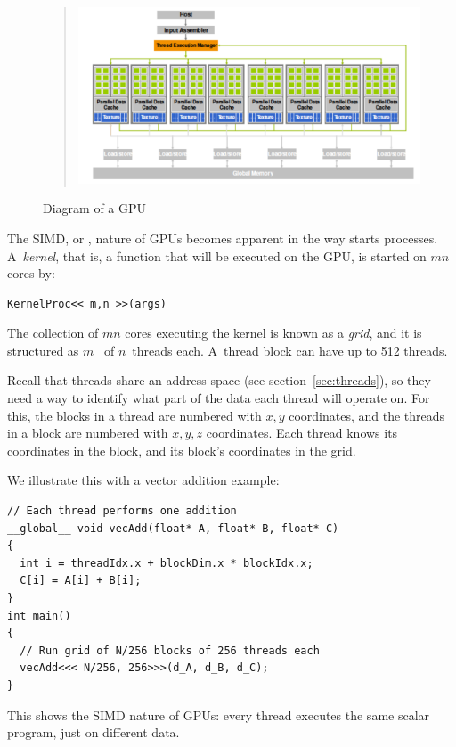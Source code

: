 \begin{figure}[ht]
  \begin{quote}
    \includegraphics[scale=.6]{graphics-public/gpu1}
  \end{quote}
  \caption{Diagram of a GPU}
  \label{fig:gpu-diagram}
\end{figure}

The \ac{SIMD}, or , nature of \acp{GPU} becomes
apparent in the way  starts
processes. A~\emph{kernel}, that is, a function that will
be executed on the \ac{GPU}, is started on $mn$ cores by:
\begin{verbatim}
KernelProc<< m,n >>(args)
\end{verbatim}
The collection of $mn$ cores executing the kernel is known as a
\emph{grid}, and it is structured as
$m$~ of $n$~threads each. 
A~thread block can have up to 512 threads.

Recall that threads share an address space (see
section~\ref{sec:threads}), so they need a way to identify what part
of the data each thread will operate on. For this, the blocks in a
thread are numbered with $x,y$ coordinates, and the threads in a block
are numbered with $x,y,z$ coordinates. Each thread knows its
coordinates in the block, and its block's coordinates in the grid.

We illustrate this with a vector addition example:
\begin{verbatim}
// Each thread performs one addition
__global__ void vecAdd(float* A, float* B, float* C)
{
  int i = threadIdx.x + blockDim.x * blockIdx.x;
  C[i] = A[i] + B[i];
}
int main()
{
  // Run grid of N/256 blocks of 256 threads each
  vecAdd<<< N/256, 256>>>(d_A, d_B, d_C);
}
\end{verbatim}
This shows the \ac{SIMD} nature of \acp{GPU}: every thread executes
the same scalar program, just on different data.

